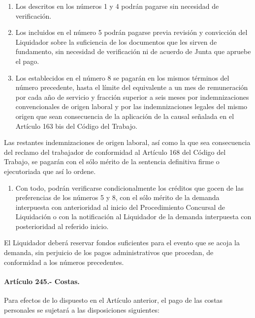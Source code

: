 \documentclass[
]{book}
\providecommand{\tightlist}{%
  \setlength{\itemsep}{0pt}\setlength{\parskip}{0pt}}
\begin{document}
\begin{enumerate}
\def\labelenumi{\arabic{enumi})}
\item
  Los descritos en los números 1 y 4 podrán pagarse sin necesidad de verificación.
\item
  Los incluidos en el número 5 podrán pagarse previa revisión y convicción del Liquidador sobre la suficiencia de los documentos que les sirven de fundamento, sin necesidad de verificación ni de acuerdo de Junta que apruebe el pago.
\item
  Los establecidos en el número 8 se pagarán en los mismos términos del número precedente, hasta el límite del equivalente a un mes de remuneración por cada año de servicio y fracción superior a seis meses por indemnizaciones convencionales de origen laboral y por las indemnizaciones legales del mismo origen que sean consecuencia de la aplicación de la causal señalada en el Artículo 163 bis del Código del Trabajo.
\end{enumerate}

Las restantes indemnizaciones de origen laboral, así como la que sea consecuencia del reclamo del trabajador de conformidad al Artículo 168 del Código del Trabajo, se pagarán con el sólo mérito de la sentencia definitiva firme o ejecutoriada que así lo ordene.

\begin{enumerate}
\def\labelenumi{\arabic{enumi})}
\setcounter{enumi}{3}
\tightlist
\item
  Con todo, podrán verificarse condicionalmente los créditos que gocen de las preferencias de los números 5 y 8, con el sólo mérito de la demanda interpuesta con anterioridad al inicio del Procedimiento Concursal de Liquidación o con la notificación al Liquidador de la demanda interpuesta con posterioridad al referido inicio.
\end{enumerate}

El Liquidador deberá reservar fondos suficientes para el evento que se acoja la demanda, sin perjuicio de los pagos administrativos que procedan, de conformidad a los números precedentes.

\hypertarget{artuxedculo-245.--costas.}{%
\paragraph*{Artículo 245.- Costas.}\label{artuxedculo-245.--costas.}}

Para efectos de lo dispuesto en el Artículo anterior, el pago de las costas personales se sujetará a las disposiciones siguientes:
\end{document}
